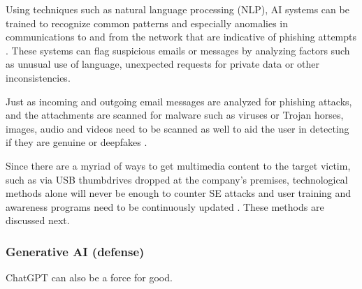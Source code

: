 Using techniques such as natural language processing (NLP), AI systems can be trained to recognize common patterns and especially anomalies in communications to and from the network that are indicative of phishing attempts \citep{basitComprehensiveSurveyAIenabledPhishingAttacks2021}. These systems can flag suspicious emails or messages by analyzing factors such as unusual use of language, unexpected requests for private data or other inconsistencies.


Just as incoming and outgoing email messages are analyzed for phishing attacks, and the attachments are scanned for malware such as viruses or Trojan horses, images, audio and videos need to be scanned as well to aid the user in detecting if they are genuine or deepfakes \citep{mirskyTheCreationAndDetectionOfDeepfakes2021}.

Since there are a myriad of ways to get multimedia content to the target victim, such as via USB thumbdrives dropped at the company's premises, technological methods alone will never be enough to counter SE attacks and user training and awareness programs need to be continuously updated \citep{hadnagySocialEngineering2018}. These methods are discussed next.

\subsubsection{Generative AI (defense)}
\begin{comment}

Generative AI (ChatGPT etc) for defensive purposes

What to cover:
    - How ChatGPT can find errors in code
    - ChatGPT can generate test cases for code
    - Datan analyysi poikkeamien löytämiseksi?
    
\end{comment}

ChatGPT can also be a force for good.


